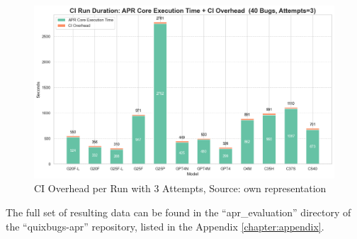 \begin{figure}[H]
    \centering
    \includegraphics[width=1\textwidth]{images/diagrams/ci_vs_exec_time_per_run_stacked_attempts_3.png}
    \caption{CI Overhead per Run with 3 Attempts, Source: own representation}
    \label{fig:ci-vs-exec-time-per-run-attempts-3}
\end{figure}


The full set of resulting data can be found in the ``apr\_evaluation'' directory of the ``quixbugs-apr'' repository, listed in the Appendix \ref{chapter:appendix}.